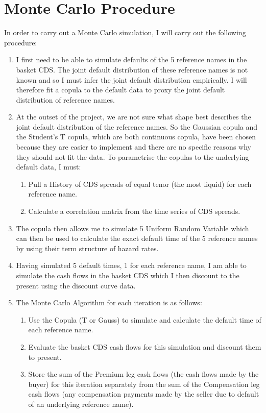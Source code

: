 \documentclass{report}
\theoremstyle{plain}
\theoremstyle{definition}
\begin{document}
\section{Monte Carlo Procedure}
In order to carry out a Monte Carlo simulation, I will carry out the following procedure: 

\begin{enumerate}
\item I first need to be able to simulate defaults of the 5 reference names in the basket CDS. The joint default distribution of these reference names is not known and so I must infer the joint default distribution empirically. I will therefore fit a copula to the default data to proxy the joint default distribution of reference names.
\item At the outset of the project, we are not sure what shape best describes the joint default distribution of the reference names. So the Gaussian copula and the Student's T copula, which are both continuous copula, have been chosen because they are easier to implement and there are no specific reasons why they should not fit the data. To parametrise the copulas to the underlying default data, I must: 
	\begin{enumerate}
		\item Pull a History of CDS spreads of equal tenor (the most liquid) for each reference name.
		\item Calculate a correlation matrix from the time series of CDS spreads.
	\end{enumerate}
\item The copula then allows me to simulate 5 Uniform Random Variable which can then be used to calculate the exact default time of the 5 reference names by using their term structure of hazard rates.
\item Having simulated 5 default times, 1 for each reference name, I am able to simulate the cash flows in the basket CDS which I then discount to the present using the discount curve data.
\item The Monte Carlo Algorithm for each iteration is as follows: 
	\begin{enumerate}
		\item Use the Copula (T or Gauss) to simulate and calculate the default time of each reference name.
		\item Evaluate the basket CDS cash flows for this simulation and discount them to present. 
		\item Store the sum of the Premium leg cash flows (the cash flows made by the buyer) for this iteration separately from the sum of the Compensation leg cash flows (any compensation payments made by the seller due to default of an underlying reference name).

\end{enumerate}
\end{enumerate}
\end{document}
